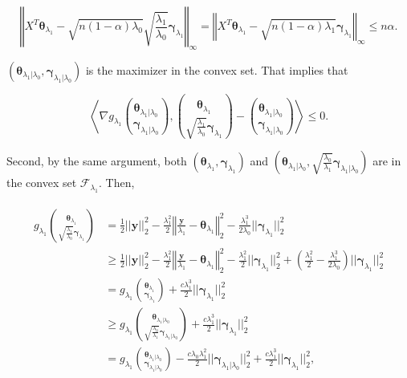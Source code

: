\begin{equation}
    \left\Vert X^T\boldsymbol\theta_{\lambda_1}-\sqrt{n(1-\alpha)\lambda_0}\sqrt{\frac{\lambda_1}{\lambda_0}}\boldsymbol\gamma_{\lambda_1}\right\Vert_\infty= \left\Vert X^T\boldsymbol\theta_{\lambda_1}-\sqrt{n(1-\alpha)\lambda_1}\boldsymbol\gamma_{\lambda_1}\right\Vert_\infty\leq n\alpha.
\end{equation}

$(\boldsymbol\theta_{\lambda_1|\lambda_0},\boldsymbol\gamma_{\lambda_1|\lambda_0})$ is the maximizer in the convex set. That implies that

\begin{equation}
    \label{eq:1.3.2}
    \left\langle\nabla g_{\lambda_1}\binom{\boldsymbol\theta_{\lambda_1|\lambda_0}}{\boldsymbol\gamma_{\lambda_1|\lambda_0}},\binom{\boldsymbol\theta_{\lambda_1}}{\sqrt{\frac{\lambda_1}{\lambda_0}}\boldsymbol\gamma_{\lambda_1}}-\binom{\boldsymbol\theta_{\lambda_1|\lambda_0}}{\boldsymbol\gamma_{\lambda_1|\lambda_0}}\right\rangle\leq 0.
\end{equation}

Second, by the same argument, both $(\boldsymbol\theta_{\lambda_1},\boldsymbol\gamma_{\lambda_1})$ and $\left(\boldsymbol\theta_{\lambda_1|\lambda_0},\sqrt{\frac{\lambda_0}{\lambda_1}}\boldsymbol\gamma_{\lambda_1|\lambda_0}\right)$ are in the convex set $\mathcal{F}_{\lambda_1}$. Then,

\begin{gather}
    \label{eq:1.3.3}
    \begin{aligned}
        g_{\lambda_1}\binom{\boldsymbol\theta_{\lambda_1}}{\sqrt{\frac{\lambda_1}{\lambda_0}}\boldsymbol\gamma_{\lambda_1}}&=\frac{1}{2}||\boldsymbol y||_2^2-\frac{\lambda_1^2}{2}\left\Vert\frac{\boldsymbol y}{\lambda_1}-\boldsymbol\theta_{\lambda_1}\right\Vert_2^2-\frac{\lambda_1^3}{2\lambda_0}||\boldsymbol\gamma_{\lambda_1}||_2^2\\
        &\geq \frac{1}{2}||\boldsymbol y||_2^2-\frac{\lambda_1^2}{2}\left\Vert\frac{\boldsymbol y}{\lambda_1}-\boldsymbol\theta_{\lambda_1}\right\Vert_2^2-\frac{\lambda_1^2}{2}||\boldsymbol\gamma_{\lambda_1}||_2^2+\left(\frac{\lambda_1^2}{2}-\frac{\lambda_1^3}{2\lambda_0}\right)||\boldsymbol\gamma_{\lambda_1}||_2^2\\
        &=g_{\lambda_1}\binom{\boldsymbol\theta_{\lambda_1}}{\boldsymbol\gamma_{\lambda_1}}+\frac{c\lambda_1^3}{2}||\boldsymbol\gamma_{\lambda_1}||_2^2\\
        &\geq g_{\lambda_1}\binom{\boldsymbol\theta_{\lambda_1|\lambda_0}}{\sqrt{\frac{\lambda_0}{\lambda_1}}\boldsymbol\gamma_{\lambda_1|\lambda_0}}+\frac{c\lambda_1^3}{2}||\boldsymbol\gamma_{\lambda_1}||_2^2\\
        &=g_{\lambda_1}\binom{\boldsymbol\theta_{\lambda_1|\lambda_0}}{\boldsymbol\gamma_{\lambda_1|\lambda_0}}-\frac{c\lambda_0\lambda_1^2}{2}||\boldsymbol\gamma_{\lambda_1|\lambda_0}||_2^2+\frac{c\lambda_1^3}{2}||\boldsymbol\gamma_{\lambda_1}||_2^2,
    \end{aligned}
\end{gather}

